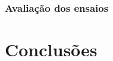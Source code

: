 \documentclass[
	12pt,				%
	openright,			%
	oneside,			%
	a4paper,			%
	english,			%
	french,				%
	spanish,			%
	brazil,				%
	oldfontcommands
	]{abntex2}
\begin{document}
\subsection[Avaliação dos ensaios]{Avaliação dos ensaios}



\chapter[Conclusões]{Conclusões} \label{ultimo_capitulo}




\end{document}
